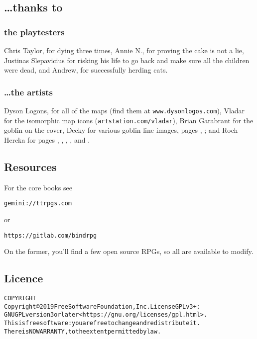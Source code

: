 \vspace{3cm}

\begin{multicols}{2}

\subsection*{\ldots thanks to}
\subsubsection*{the playtesters}
Chris Taylor, for dying three times,
Annie N., for proving the cake is not a lie,
Justinas Slepavicius for risking his life to go back and make sure all the children were dead,
and Andrew, for successfully herding cats.

\subsubsection*{\ldots the artists}

Dyson Logons, for all of the maps (find them at {\tt www.dysonlogos.com}),
\iftoggle{hardcore}{%
Daniel F. Walthall for the flat dungeon icon images in the Alchemist's tower,
}{}%
Vladar for the isomorphic map icons ({\tt artstation.com/vladar}),
Brian Garabrant for the goblin on the cover,
Decky for various goblin line images, pages \pageref{Decky:armoury}, \pageref{Decky/screech};
and Roch Hercka for pages \pageref{roch:transformation}, \pageref{roch:waking}, \pageref{roch:dragon}, \pageref{roch:garden}, and \pageref{roch:ogres}.

\columnbreak

\subsection{Resources}

For the core books see 

\begin{alltt} gemini://ttrpgs.com \end{alltt} 
or 
\begin{alltt} https://gitlab.com/bindrpg \end{alltt}
On the former, you'll find a few open source RPGs, so all are available to modify.

\end{multicols}

\subsection*{Licence}

\begin{alltt}
COPYRIGHT
       Copyright \copyright 2019 Free Software Foundation, Inc.  License GPLv3+:
  GNU GPL version 3 or later <https://gnu.org/licenses/gpl.html>.
       This is free software: you are free to change and redistribute it.
  There is NO WARRANTY, to the extent permitted by law.

\end{alltt}

